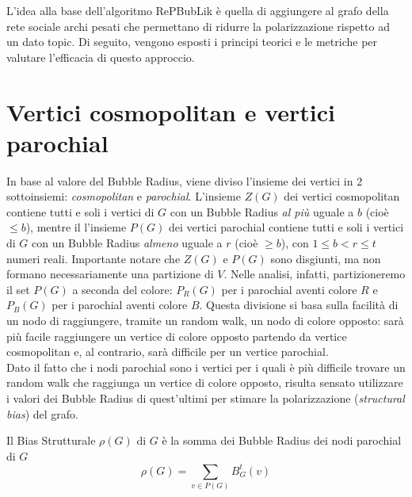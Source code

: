 L'idea alla base dell'algoritmo RePBubLik è quella di aggiungere al grafo
della rete sociale archi pesati che permettano di ridurre la polarizzazione 
rispetto ad un dato topic. Di seguito, vengono esposti i principi teorici e 
le metriche per valutare l'efficacia di questo approccio. 

\section{Vertici cosmopolitan e vertici parochial}
In base al valore del Bubble Radius, viene diviso l'insieme dei vertici in 2 
sottoinsiemi: \emph{cosmopolitan} e \emph{parochial}. L'insieme $Z(G)$ dei vertici 
cosmopolitan contiene tutti e soli i vertici di $G$ con un Bubble Radius 
\emph{al più} uguale a $b$ (cioè $\le b$), mentre il l'insieme $P(G)$ dei
vertici parochial contiene tutti e soli i vertici di $G$ con un 
Bubble Radius \emph{almeno} uguale a $r$ (cioè $\ge b$), con $1\le b < r \le t$ 
numeri reali. Importante notare che $Z(G)$ e $P(G)$ sono disgiunti, 
ma non formano necessariamente una partizione di $V$. Nelle analisi, infatti,
partizioneremo il set $P(G)$ a seconda del colore: $P_R(G)$ per i parochial 
aventi colore $R$ e $P_B(G)$ per i parochial aventi colore $B$. 
Questa divisione si basa sulla facilità di un nodo di raggiungere, tramite un random walk, 
un nodo di colore opposto: sarà più facile raggiungere un vertice di colore opposto partendo 
da vertice cosmopolitan e, al contrario, sarà difficile per un vertice parochial.\\
Dato il fatto che i nodi parochial sono i vertici per i quali è più difficile
trovare un random walk che raggiunga un vertice di colore opposto, 
risulta sensato utilizzare i valori dei Bubble Radius di quest'ultimi per stimare la polarizzazione 
(\emph{structural bias}) del grafo.
\begin{definition}
    Il Bias Strutturale $\rho(G)$ di $G$ è la somma dei Bubble Radius dei nodi parochial di $G$
    \begin{equation}\label{REP:bias}
        \rho(G)=\sum_{v \in P(G)}{B_{G}^t(v)}
    \end{equation}
\end{definition}
